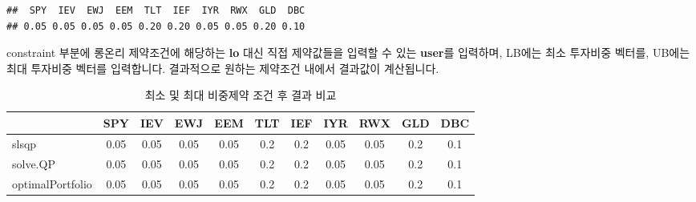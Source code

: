 \documentclass[12pt,]{book}
\newenvironment{Shaded}{\begin{snugshade}}{\end{snugshade}}
\newcommand{\DataTypeTok}[1]{\textcolor[rgb]{0.13,0.29,0.53}{#1}}
\newcommand{\DecValTok}[1]{\textcolor[rgb]{0.00,0.00,0.81}{#1}}
\newcommand{\FloatTok}[1]{\textcolor[rgb]{0.00,0.00,0.81}{#1}}
\newcommand{\KeywordTok}[1]{\textcolor[rgb]{0.13,0.29,0.53}{\textbf{#1}}}
\newcommand{\NormalTok}[1]{#1}
\newcommand{\OperatorTok}[1]{\textcolor[rgb]{0.81,0.36,0.00}{\textbf{#1}}}
\newcommand{\StringTok}[1]{\textcolor[rgb]{0.31,0.60,0.02}{#1}}
\begin{document}
\begin{Shaded}
\end{Shaded}

\begin{verbatim}
##  SPY  IEV  EWJ  EEM  TLT  IEF  IYR  RWX  GLD  DBC 
## 0.05 0.05 0.05 0.05 0.20 0.20 0.05 0.05 0.20 0.10
\end{verbatim}

constraint 부분에 롱온리 제약조건에 해당하는 \textbf{lo} 대신 직접 제약값들을 입력할 수 있는 \textbf{user}를 입력하며, LB에는 최소 투자비중 벡터를, UB에는 최대 투자비중 벡터를 입력합니다. 결과적으로 원하는 제약조건 내에서 결과값이 계산됩니다.

\begin{table}[!h]

\caption{\label{tab:unnamed-chunk-23}최소 및 최대 비중제약 조건 후 결과 비교}
\centering
\fontsize{8}{10}\selectfont
\begin{tabular}{lcccccccccc}
\toprule
  & SPY & IEV & EWJ & EEM & TLT & IEF & IYR & RWX & GLD & DBC\\
\midrule
\rowcolor{gray!6}  slsqp & 0.05 & 0.05 & 0.05 & 0.05 & 0.2 & 0.2 & 0.05 & 0.05 & 0.2 & 0.1\\
solve.QP & 0.05 & 0.05 & 0.05 & 0.05 & 0.2 & 0.2 & 0.05 & 0.05 & 0.2 & 0.1\\
\rowcolor{gray!6}  optimalPortfolio & 0.05 & 0.05 & 0.05 & 0.05 & 0.2 & 0.2 & 0.05 & 0.05 & 0.2 & 0.1\\
\bottomrule
\end{tabular}
\end{table}
\end{document}
